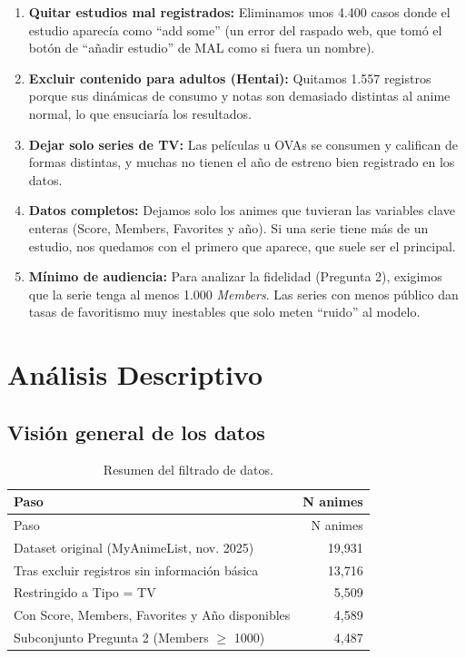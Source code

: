 \documentclass[
  spanish,
  11pt,
  letterpaper,
]{article}
\providecommand{\tightlist}{%
  \setlength{\itemsep}{0pt}\setlength{\parskip}{0pt}}
\begin{document}
\begin{enumerate}
\def\labelenumi{\arabic{enumi}.}
\tightlist
\item
  \textbf{Quitar estudios mal registrados:} Eliminamos unos 4.400 casos
  donde el estudio aparecía como ``add some'' (un error del raspado web,
  que tomó el botón de ``añadir estudio'' de MAL como si fuera un
  nombre).
\item
  \textbf{Excluir contenido para adultos (Hentai):} Quitamos 1.557
  registros porque sus dinámicas de consumo y notas son demasiado
  distintas al anime normal, lo que ensuciaría los resultados.
\item
  \textbf{Dejar solo series de TV:} Las películas u OVAs se consumen y
  califican de formas distintas, y muchas no tienen el año de estreno
  bien registrado en los datos.
\item
  \textbf{Datos completos:} Dejamos solo los animes que tuvieran las
  variables clave enteras (Score, Members, Favorites y año). Si una
  serie tiene más de un estudio, nos quedamos con el primero que
  aparece, que suele ser el principal.
\item
  \textbf{Mínimo de audiencia:} Para analizar la fidelidad (Pregunta 2),
  exigimos que la serie tenga al menos 1.000 \emph{Members}. Las series
  con menos público dan tasas de favoritismo muy inestables que solo
  meten ``ruido'' al modelo.
\end{enumerate}

\section{Análisis Descriptivo}\label{anuxe1lisis-descriptivo}

\subsection{Visión general de los
datos}\label{visiuxf3n-general-de-los-datos}

\begin{longtable}[]{@{}lr@{}}
\caption{Resumen del filtrado de datos.}\tabularnewline
\toprule\noalign{}
Paso & N animes \\
\midrule\noalign{}
\endfirsthead
\toprule\noalign{}
Paso & N animes \\
\midrule\noalign{}
\endhead
\bottomrule\noalign{}
\endlastfoot
Dataset original (MyAnimeList, nov. 2025) & 19,931 \\
Tras excluir registros sin información básica & 13,716 \\
Restringido a Tipo = TV & 5,509 \\
Con Score, Members, Favorites y Año disponibles & 4,589 \\
Subconjunto Pregunta 2 (Members \(\geq\) 1000) & 4,487 \\
\end{longtable}
\end{document}
